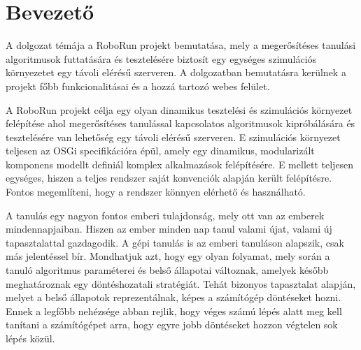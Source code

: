 \chapter{Bevezető}\label{ch:BEVEZETO}
	A dolgozat témája a RoboRun projekt bemutatása, mely a megerősítéses tanulási algoritmusok futtatására és tesztelésére biztosít egy egységes szimulációs környezetet egy távoli elérésű szerveren. 
A dolgozatban bemutatásra kerülnek a projekt főbb funkcionalitásai és a hozzá tartozó webes felület.

	A RoboRun projekt célja egy olyan dinamikus tesztelési és szimulációs környezet felépítése ahol megerősítéses tanulással kapcsolatos algoritmusok kipróbálására és tesztelésére van lehetőség egy távoli elérésű szerveren. E szimulációs környezet teljesen az OSGi\cite{osgi} specifikációra épül, amely egy dinamikus, modularizált komponens modellt definiál komplex alkalmazások felépítésére. E mellett teljesen egységes, hiszen a teljes rendszer saját konvenciók alapján került felépítésre. Fontos megemlíteni, hogy a rendszer könnyen elérhető és használható.
	
	A tanulás egy nagyon fontos emberi tulajdonság, mely ott van az emberek mindennapjaiban. Hiszen az ember minden nap tanul valami újat, valami új tapasztalattal gazdagodik. A gépi tanulás is az emberi tanuláson alapszik, csak más jelentéssel bír. Mondhatjuk azt, hogy egy olyan folyamat, mely során a tanuló algoritmus paraméterei és belső állapotai változnak, amelyek később meghatároznak egy döntéshozatali stratégiát. Tehát bizonyos tapasztalat alapján, melyet a belső állapotok reprezentálnak, képes a számítógép döntéseket hozni. Ennek a legfőbb nehézsége abban rejlik, hogy véges számú lépés alatt meg kell tanítani a számítógépet arra, hogy egyre jobb döntéseket hozzon végtelen sok lépés közül.
	

